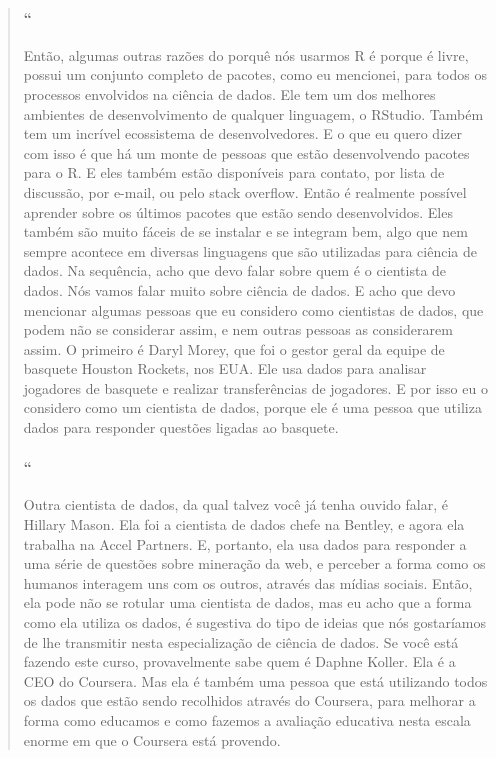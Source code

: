 \begin{quotation}
\begin{small}
\paragraph{``}
Então, algumas outras razões do porquê nós usarmos R é porque é livre, possui um conjunto completo de pacotes, como eu mencionei,  para todos os processos envolvidos na ciência de dados. Ele tem um dos melhores ambientes de desenvolvimento de qualquer linguagem, o RStudio. Também tem um incrível ecossistema de desenvolvedores. E o que eu quero dizer com isso é que há um monte de pessoas que estão desenvolvendo pacotes para o R. E eles também estão disponíveis para contato, por lista de discussão, por e-mail, ou pelo stack overflow. Então é realmente possível aprender sobre os últimos pacotes que estão sendo desenvolvidos. Eles também são muito fáceis de se instalar e se integram bem, algo que nem sempre acontece em diversas linguagens que são utilizadas para ciência de dados. Na sequência, acho que devo falar sobre quem é o cientista de dados. Nós vamos falar muito sobre ciência de dados.  E acho que devo mencionar algumas pessoas que eu considero como cientistas de dados,  que podem não se considerar assim, e nem outras pessoas as considerarem assim. O primeiro é Daryl Morey, que foi o gestor geral da equipe de basquete Houston Rockets, nos EUA. Ele usa dados para analisar jogadores de basquete e realizar transferências de jogadores. E por isso eu o considero como um cientista de dados, porque ele é uma pessoa que utiliza dados para responder questões ligadas ao basquete.

\paragraph{``}
Outra cientista de dados, da qual talvez você já tenha ouvido falar, é Hillary Mason. Ela foi a cientista de dados chefe na Bentley,  e agora ela trabalha na Accel Partners. E, portanto, ela usa dados para responder a uma série de questões sobre mineração da web, e perceber a forma como os humanos interagem uns com os outros, através das mídias sociais. Então, ela pode não se rotular uma cientista de dados, mas eu acho que a forma como ela utiliza os dados, é sugestiva do tipo de ideias que nós gostaríamos de lhe transmitir nesta especialização de ciência de dados. Se você está fazendo este curso, provavelmente sabe quem é Daphne Koller. Ela é a CEO do Coursera. Mas ela é também uma pessoa que está utilizando todos os dados que estão sendo recolhidos através do Coursera, para melhorar a forma como educamos e como fazemos a avaliação educativa nesta escala enorme em que o Coursera está provendo.


\end{small}
\end{quotation}
